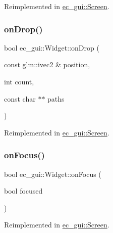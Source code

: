 Reimplemented in \mbox{\hyperlink{classec__gui_1_1_screen_a7f641a6e7331d1f9f2f07997961a4568}{ec\+\_\+gui\+::\+Screen}}.

\mbox{\label{classec__gui_1_1_widget_a4f4db0e6b761f3d659f2426d152a0ae2}} 
\subsubsection{\texorpdfstring{on\+Drop()}{onDrop()}}
{\footnotesize\ttfamily bool ec\+\_\+gui\+::\+Widget\+::on\+Drop (\begin{DoxyParamCaption}\item[{const glm\+::ivec2 \&}]{position,  }\item[{int}]{count,  }\item[{const char $\ast$$\ast$}]{paths }\end{DoxyParamCaption})\hspace{0.3cm}{\ttfamily [virtual]}}



Reimplemented in \mbox{\hyperlink{classec__gui_1_1_screen_a5554d10648c66060b5eb96c5ff918b58}{ec\+\_\+gui\+::\+Screen}}.

\mbox{\label{classec__gui_1_1_widget_a191230613536809bda9c930d3a2ced7c}} 
\subsubsection{\texorpdfstring{on\+Focus()}{onFocus()}}
{\footnotesize\ttfamily bool ec\+\_\+gui\+::\+Widget\+::on\+Focus (\begin{DoxyParamCaption}\item[{bool}]{focused }\end{DoxyParamCaption})\hspace{0.3cm}{\ttfamily [virtual]}}



Reimplemented in \mbox{\hyperlink{classec__gui_1_1_screen_a24a7266d24d743aa7b4c4fce6e8d2235}{ec\+\_\+gui\+::\+Screen}}.

\mbox{\label{classec__gui_1_1_widget_a360664ea02b08a96e19c4c1cbdcd0fc8}} 
